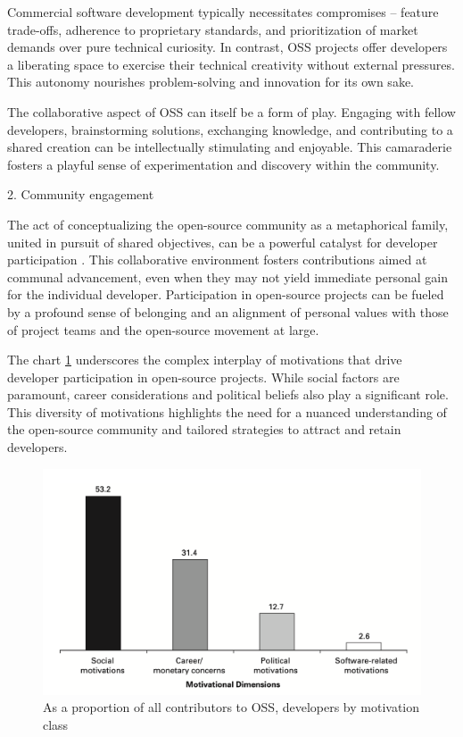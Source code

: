 Commercial software development typically necessitates compromises – feature trade-offs, adherence to proprietary standards, and prioritization of market demands over pure technical curiosity. In contrast, OSS projects offer developers a liberating space to exercise their technical creativity without external pressures. This autonomy nourishes problem-solving and innovation for its own sake.

The collaborative aspect of OSS can itself be a form of play.  Engaging with fellow developers, brainstorming solutions, exchanging knowledge, and contributing to a shared creation can be intellectually stimulating and enjoyable. This camaraderie fosters a playful sense of experimentation and discovery within the community.


2. Community engagement

The act of conceptualizing the open-source community as a metaphorical family, united in pursuit of shared objectives, can be a powerful catalyst for developer participation \parencite{05bitzer2007intrinsic,07zhao2024openrank, 08zhang2024paid, 09lakhani2005hackers, 13li2012leadership, 16ke2008motivations, 17alexander2002working}. This collaborative environment fosters contributions aimed at communal advancement, even when they may not yield immediate personal gain for the individual developer. Participation in open-source projects can be fueled by a profound sense of belonging and an alignment of personal values with those of project teams and the open-source movement at large.

The chart \ref{fig:motivationDimension} underscores the complex interplay of motivations that drive developer participation in open-source projects. While social factors are paramount, career considerations and political beliefs also play a significant role. This diversity of motivations highlights the need for a nuanced understanding of the open-source community and tailored strategies to attract and retain developers.

\begin{figure}[ht]
    \centering
    \includegraphics[width=0.7\linewidth]{figs/motivationDimension.png}
    \caption{As a proportion of all contributors to OSS, developers by motivation class \cite{ghosh2002free}}
    \label{fig:motivationDimension}
\end{figure}

